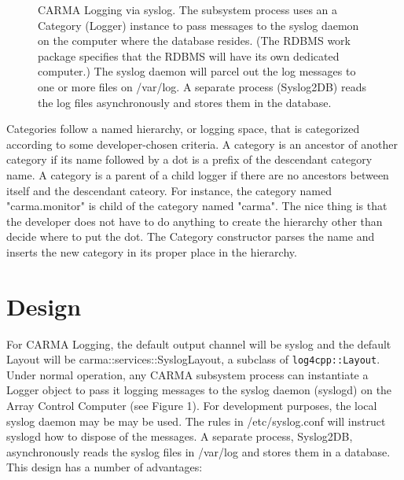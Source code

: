 \documentclass[preprint]{aastex}
\begin{document}
\begin{figure}
\caption{CARMA Logging via syslog. The subsystem process uses an 
a Category (Logger) instance to pass messages to the syslog daemon on 
the computer where the database resides. 
(The RDBMS work package specifies that the RDBMS will have its
own dedicated computer.) The syslog daemon will
parcel out the log messages to one or more files on /var/log. A
separate process (Syslog2DB) reads the log files asynchronously
and stores them in the database.
}
\end{figure}

Categories follow a named hierarchy, or logging space,  that is
categorized according to some developer-chosen criteria.  A category
is an ancestor of another category if its name followed by a dot
is a prefix of the descendant category name. A category is a parent
of a child logger if there are no ancestors between itself and the
descendant cateory. For instance, the category named "carma.monitor"
is child of the category named "carma".  The nice thing is that
the developer does not have to do anything to create the hierarchy
other than decide where to put the dot.  The Category constructor
parses the name and inserts the new category in its proper place
in the hierarchy.

\section{Design}
For CARMA Logging, the default output channel will be syslog
and the default Layout will be carma::services::SyslogLayout, a 
subclass of {\tt log4cpp::Layout}.  Under normal operation, any CARMA subsystem
process can instantiate a Logger object to pass it logging messages
to the syslog daemon (syslogd) on the Array Control Computer (see
Figure 1). For development purposes, the local syslog daemon may be
may be used.  The rules in /etc/syslog.conf will instruct
syslogd how to dispose of the messages.  A separate process,
Syslog2DB, asynchronously reads the syslog files in /var/log and
stores them in a database.  This design has a number of advantages:
\end{document}
